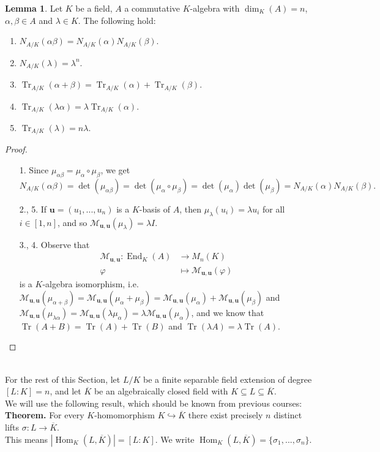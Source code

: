 \documentclass[12pt,a4paper]{report}
\theoremstyle{definition}
\newtheorem{lemma}[theorem]{Lemma}
\theoremstyle{num.custom-title}
\DeclareMathOperator{\Hom}{Hom}
\DeclareMathOperator{\End}{End}
\DeclareMathOperator{\sse}{\subseteq}
\DeclareMathOperator{\Tr}{Tr}
\newcommand{\ol}{\overline}
\newcommand{\M}{\mathcal{M}}
\renewcommand{\phi}{\varphi}
\renewcommand{\u}{\mathbf{u}}
\begin{document}
\begin{lemma}
Let $K$ be a field, $A$ a commutative $K$-algebra with $\dim_K(A)=n$, $\alpha,\beta \in A$ and $\lambda \in K$. The following hold:
\begin{enumerate}
\item $N_{A/K}(\alpha\beta)=N_{A/K}(\alpha)N_{A/K}(\beta)$.
\item $N_{A/K}(\lambda)=\lambda^n$.
\item $\Tr_{A/K}(\alpha + \beta) = \Tr_{A/K}(\alpha) + \Tr_{A/K}(\beta)$.
\item $\Tr_{A/K}(\lambda \alpha) = \lambda \Tr_{A/K}(\alpha)$.
\item $\Tr_{A/K}(\lambda) = n\lambda$.
\end{enumerate}
\begin{proof}\ 
\begin{itemize}
\item[1.] Since $\mu_{\alpha\beta}=\mu_\alpha \circ \mu_\beta$, we get
\[
N_{A/K}(\alpha\beta) = \det(\mu_{\alpha\beta}) = \det(\mu_\alpha \circ \mu_\beta) = \det(\mu_\alpha) \det(\mu_\beta) = N_{A/K}(\alpha) N_{A/K}(\beta).
\]
\item[2., 5.] If $\u=(u_1,...,u_n)$ is a $K$-basis of $A$, then $\mu_\lambda (u_i) = \lambda u_i$ for all $i \in [1,n]$, and so $\M_{\u,\u}(\mu_\lambda) = \lambda I$.
\item[3., 4.] Observe that
\begin{align*}
\M_{\u,\u} \colon \End_K(A) &\to M_n(K) \\
\phi &\mapsto \M_{\u,\u}(\phi)
\end{align*}
is a $K$-algebra isomorphism, i.e. $\M_{\u,\u}(\mu_{\alpha+\beta}) = \M_{\u,\u}(\mu_\alpha+\mu_\beta) = \M_{\u,\u}(\mu_\alpha)+\M_{\u,\u}(\mu_\beta)$ and $\M_{\u,\u}(\mu_{\lambda \alpha}) = \M_{\u,\u}(\lambda \mu_\alpha) = \lambda \M_{\u,\u}(\mu_\alpha)$, and we know that $\Tr(A+B) = \Tr(A) + \Tr(B)$ and $\Tr(\lambda A) = \lambda \Tr(A)$.
\end{itemize}
\end{proof}
\end{lemma}\ 
\\
\noindent For the rest of this Section, let $L/K$ be a finite separable field extension of degree $[L:K]=n$, and let $\ol{K}$ be an algebraically closed field with $K \sse L \sse \ol{K}$.\\
We will use the following result, which should be known from previous courses:\\
\textbf{Theorem.} For every $K$-homomorphism $K \hookrightarrow \ol{K}$ there exist precisely $n$ distinct lifts $\sigma: L \to \ol{K}$.\\ This means $|\Hom_K(L,\ol{K})| = [L:K]$. We write $\Hom_K(L,\ol{K}) = \{\sigma_1,...,\sigma_n\}$.
\end{document}
